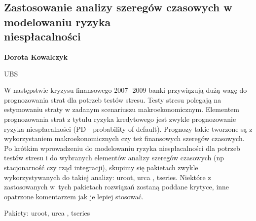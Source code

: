 \documentclass[\main/boa.tex]{subfiles}
\begin{document}
\subsection{Zastosowanie analizy szeregów czasowych w modelowaniu ryzyka\\ niespłacalności}

\begin{minipage}{0.915\textwidth}
	\centering
  {\bf {} Dorota Kowalczyk}
\end{minipage}


\begin{affiliations}
\begin{minipage}{0.915\textwidth}
\centering
UBS \\[-2pt]
\end{minipage}
\end{affiliations}

\vskip 0.3cm

 W następstwie kryzysu finansowego 2007 -2009 banki przywiązują dużą wagę do prognozowania strat dla potrzeb testów stresu. Testy stresu polegają na estymowaniu straty w zadanym scenariuszu makroekonomicznym. Elementem prognozowania strat z tytułu ryzyka kredytowego jest zwykle prognozowanie ryzyka niespłacalności (PD - probability of default). Prognozy takie tworzone są z wykorzystaniem makroekonomicznych czy też finansowych szeregów czasowych. Po krótkim wprowadzeniu do modelowaniu ryzyka niespłacalności dla potrzeb testów stresu i do wybranych elementów analizy szeregów czasowych (np stacjonarność czy rząd integracji), skupimy się pakietach zwykle wykorzystywanych do takiej analizy: uroot, urca , tseries. Niektóre z zastosowanych w~tych pakietach rozwiązań zostaną poddane krytyce, inne opatrzone komentarzem jak je lepiej stosować.

Pakiety: uroot, urca , tseries
\end{document}

